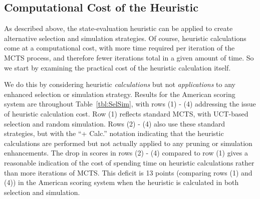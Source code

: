 \documentclass[letterpaper]{article}
\begin{document}


\subsection{Computational Cost of the Heuristic}

As described above, the state-evaluation heuristic can be applied to create alternative selection and simulation strategies. Of course, heuristic calculations come at a computational cost, with more time required per iteration of the MCTS process, and therefore fewer iterations total in a given amount of time. So we start by examining the practical cost of the heuristic calculation itself.

We do this by considering heuristic {\it calculations} but not {\it applications} to any enhanced selection or simulation strategy. Results for the American scoring system are throughout Table~\ref{tbl:SelSim}, with rows (1) - (4) addressing the issue of heuristic calculation cost. Row (1) reflects standard MCTS, with UCT-based selection and random simulation. Rows (2) - (4) also use these standard strategies, but with the ``+ Calc.'' notation indicating that the heuristic calculations are performed but not actually applied to any pruning or simulation enhancements. The drop in scores in rows (2) - (4) compared to row (1) gives a reasonable indication of the cost of spending time on heuristic calculations rather than more iterations of MCTS. This deficit is 13 points (comparing rows (1) and (4)) in the American scoring system when the heuristic is calculated in both selection and simulation.
\end{document}
